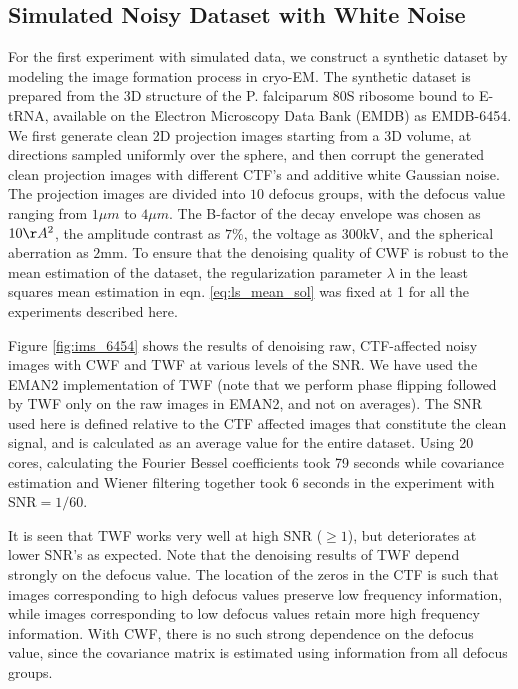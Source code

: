 \subsection{Simulated Noisy Dataset with White Noise}
\label{sec:whitenoise}
For the first experiment with simulated data, we construct a synthetic dataset 
by modeling the image formation process in 
cryo-EM. The synthetic dataset is prepared from the 3D structure of the P. 
falciparum 80S ribosome bound to E-tRNA, available on the Electron
Microscopy Data Bank (EMDB) as EMDB-6454. We first generate clean 2D projection 
images starting from a 3D volume, at directions sampled uniformly
over the sphere, and then corrupt the generated clean projection images with 
different CTF's and additive white Gaussian 
noise. The projection images are divided into $10$ defocus groups, with the 
defocus value
ranging from $1\mu m$ to $4\mu m$. The B-factor of the decay envelope was 
chosen 
as $10\AA^2$, the amplitude contrast as $7\%$,
the voltage as $300$kV, and the spherical aberration as $2$mm. To ensure that 
the denoising quality of CWF is robust to the mean estimation of the dataset, 
the regularization parameter $\lambda$ in the least squares mean estimation in eqn. \ref{eq:ls_mean_sol} was 
fixed at 1 for all the experiments
described here.

Figure \ref{fig:ims_6454} shows the results of denoising 
raw, CTF-affected noisy images with CWF and
TWF at various levels of the SNR. We have used the EMAN2 \cite{eman2}
implementation of TWF (note that we perform phase flipping followed 
by TWF only on the raw images in EMAN2, and not on averages). The SNR used here is defined relative to the 
CTF affected images that constitute the clean signal, and is calculated
as an average value for the entire dataset. Using 20 cores, calculating the Fourier Bessel
coefficients took 79 seconds while covariance estimation and Wiener filtering together
took 6 seconds in the experiment with SNR$=1/60$. 

It is seen that TWF works very well at high SNR ($\geq1$), but deteriorates 
at lower SNR's as expected. Note that the denoising results of TWF depend 
strongly on the defocus value. 
The location of the zeros in the CTF is such that images 
corresponding to high defocus values preserve low frequency information, while 
images corresponding to low defocus values
retain more high frequency information. With CWF, there is no such strong 
dependence on the defocus value, since the covariance matrix is estimated
using information from all defocus groups. 



